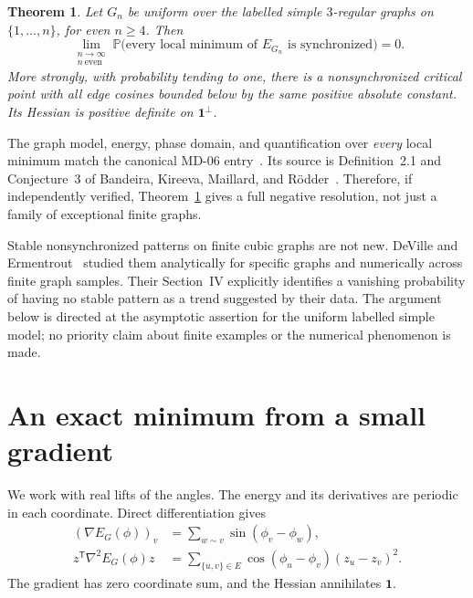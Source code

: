 \documentclass[11pt]{article}
\newtheorem{theorem}{Theorem}
\theoremstyle{definition}
\theoremstyle{remark}
\newcommand{\one}{\mathbf 1}
\newcommand{\Pp}{\mathbb P}
\begin{document}
\begin{theorem}\label{thm:main}
Let $G_n$ be uniform over the labelled simple $3$-regular graphs on
$\{1,\ldots,n\}$, for even $n\ge4$. Then
\begin{equation}\label{eq:main}
 \lim_{\substack{n\to\infty\\ n\ \mathrm{even}}}
 \Pp\bigl(\text{every local minimum of }E_{G_n}
                \text{ is synchronized}\bigr)=0.
\end{equation}
More strongly, with probability tending to one, there is a nonsynchronized
critical point with all edge cosines bounded below by the same positive
absolute constant. Its Hessian is positive definite on $\one^\perp$.
\end{theorem}

The graph model, energy, phase domain, and quantification over \emph{every}
local minimum match the canonical MD-06 entry~\cite{repo}. Its source is
Definition~2.1 and Conjecture~3 of Bandeira, Kireeva, Maillard, and
R\"odder~\cite{randomstrasse}. Therefore, if independently verified,
Theorem~\ref{thm:main} gives a full negative resolution, not just a family
of exceptional finite graphs.

Stable nonsynchronized patterns on finite cubic graphs are not new.
DeVille and Ermentrout~\cite{deville} studied them analytically for specific
graphs and numerically across finite graph samples. Their Section~IV
explicitly identifies a vanishing probability of having no stable pattern
as a trend suggested by their data. The argument below is directed at the
asymptotic assertion for the uniform labelled simple model; no priority
claim about finite examples or the numerical phenomenon is made.

\section{An exact minimum from a small gradient}

We work with real lifts of the angles. The energy and its derivatives are
periodic in each coordinate. Direct differentiation gives
\begin{align}
 (\nabla E_G(\phi))_v
   &=\sum_{w\sim v}\sin(\phi_v-\phi_w),\label{eq:gradient}\\
 z^{\mathsf T}\nabla^2E_G(\phi)z
   &=\sum_{\{u,v\}\in E}\cos(\phi_u-\phi_v)(z_u-z_v)^2.
   \label{eq:hessian}
\end{align}
The gradient has zero coordinate sum, and the Hessian annihilates $\one$.
\end{document}
